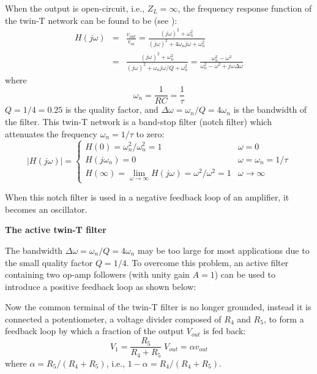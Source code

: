 When the output is open-circuit, i.e., $Z_L=\infty$, the frequency 
response function of the twin-T network can be found to be
(see ):
\begin{eqnarray}
H(j\omega)&=&\frac{v_{out}}{v_{in}}
=\frac{(j\omega)^2+\omega_n^2}{(j\omega)^2+4\omega_nj\omega+\omega_n^2}
\nonumber\\
&=&\frac{(j\omega)^2+\omega_n^2}{(j\omega)^2+\omega_nj\omega/Q+\omega_n^2}
=\frac{\omega_n^2-\omega^2}{\omega_n^2-\omega^2+j\omega\Delta\omega}
\nonumber
\end{eqnarray}
where
\[
\omega_n=\frac{1}{RC}=\frac{1}{\tau}
\]
$Q=1/4=0.25$ is the quality factor, and $\Delta\omega=\omega_n/Q=4\omega_n$ 
is the bandwidth of the filter. This twin-T network is a band-stop filter 
(notch filter) which attenuates the frequency $\omega_n=1/\tau$ to zero:
\[
|H(j\omega)|=\left\{\begin{array}{ll} 
H(0)=\omega_n^2/\omega_n^2=1 & \omega=0 \\
H(j\omega_n)=0 & \omega=\omega_n=1/\tau\\
H(\infty)=\lim\limits_{\omega\rightarrow\infty}H(j\omega)=\omega^2/\omega^2=1 & \omega\rightarrow \infty
\end{array}\right.
\]

\begin{comment}
This result can also be reached by noticing the following
\[
H'(j\omega)\big|_{\omega=1/\tau}=\frac{1}{1+j2},\;\;\;\;\;\;\;
H''(j\omega)\big|_{\omega=1/\tau}=\frac{1}{1-j2}
\]
As they are equal in magnitude but opposite in phase, their outputs 
cancel each other to produce zero output.
\end{comment}

When this notch filter is used in a negative feedback loop of an 
amplifier, it becomes an oscillator.


{\bf The active twin-T filter}

The bandwidth $\Delta\omega=\omega_n/Q=4\omega_n$ may be too large for 
most applications due to the small quality factor $Q=1/4$. To overcome 
this problem, an active filter containing two op-amp followers (with 
unity gain $A=1$) can be used to introduce a positive feedback loop as 
shown below:


Now the common terminal of the twin-T filter is no longer grounded, 
instead it is connected a potentiometer, a voltage divider composed 
of $R_4$ and $R_5$, to form a feedback loop by which a fraction of the
output $V_{out}$ is fed back:
\[
V_1=\frac{R_5}{R_4+R_5}\;V_{out}=\alpha v_{out}
\]
where $\alpha=R_5/(R_4+R_5)$, i.e., $1-\alpha=R_4/(R_4+R_5)$.

